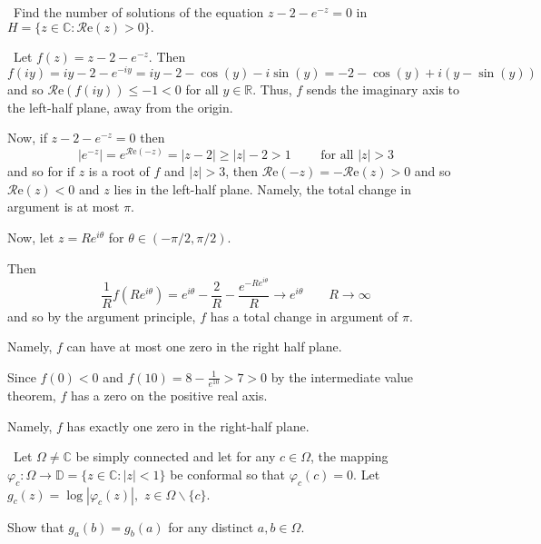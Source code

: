 \documentclass[12pt]{Homework}
\newcommand{\re}{\mathscr{R}\text{e}}
\begin{document}
\begin{problem} $\,$
Find the number of solutions of the equation $z-2-e^{-z}=0$ in $H=\{z\in\mathbb{C}:\re(z)>0\}.$
\end{problem}

\begin{solution}$\,$
Let $f(z)=z-2-e^{-z}$. Then $$f(iy)=iy-2-e^{-iy}=iy-2-\cos(y)-i\sin(y)=-2-\cos(y)+i(y-\sin(y))$$ and so $\re(f(iy))\le -1<0$ for all $y\in\mathbb{R}$. Thus, $f$ sends the imaginary axis to the left-half plane, away from the origin.

Now, if $z-2-e^{-z}=0$ then $$|e^{-z}|=e^{\re(-z)}=|z-2|\ge|z|-2>1\qquad\text{ for all }|z|>3$$ and so for if $z$ is a root of $f$ and $|z|>3$, then $\re(-z)=-\re(z)>0$ and so $\re(z)<0$ and $z$ lies in the left-half plane. Namely, the total change in argument is at most $\pi.$

Now, let $z=Re^{i\theta}$ for $\theta\in(-\pi/2,\pi/2).$

Then $$\frac{1}{R}f(Re^{i\theta})=e^{i\theta}-\frac{2}{R}-\frac{e^{-Re^{i\theta}}}{R}\to e^{i\theta}\qquad R\to\infty$$ and so by the argument principle, $f$ has a total change in argument of $\pi$.

Namely, $f$ can have at most one zero in the right half plane.

Since $f(0)<0$ and $f(10)=8-\frac{1}{e^{10}}>7>0$ by the intermediate value theorem, $f$ has a zero on the positive real axis. 

Namely, $f$ has exactly one zero in the right-half plane.

\end{solution}
\newpage




\begin{problem} $\,$
Let $\Omega\not=\mathbb{C}$ be simply connected and let for any $c\in\Omega$, the mapping $\varphi_c:\Omega\to\mathbb{D}=\{z\in\mathbb{C}:|z|<1\}$ be conformal so that $\varphi_c(c)=0.$ Let $g_c(z)=\log|\varphi_c(z)|,$ $z\in\Omega\backslash\{c\}.$

Show that $g_a(b)=g_b(a)$ for any distinct $a,b\in\Omega.$
\end{problem}
\end{document}
